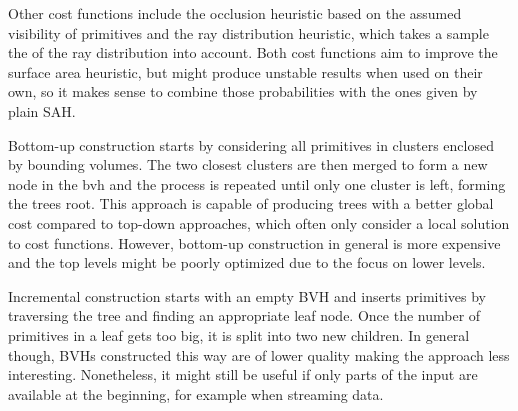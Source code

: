 Other cost functions include the occlusion heuristic\cite{vinkler12visibility} based on the assumed visibility of primitives and the ray distribution heuristic\cite{bittner09rdh}, which takes a sample the of the ray distribution into account. Both cost functions aim to improve the surface area heuristic, but might produce unstable results when used on their own, so it makes sense to combine those probabilities with the ones given by plain SAH.

Bottom-up construction\cite{Walter2008FastAC} starts by considering all primitives in clusters enclosed by bounding volumes. The two closest clusters are then merged to form a new node in the \acrshort{bvh} and the process is repeated until only one cluster is left, forming the trees root.
This approach is capable of producing trees with a better global cost compared to top-down approaches, which often only consider a local solution to cost functions. However, bottom-up construction in general is more expensive and the top levels might be poorly optimized due to the focus on lower levels.

Incremental construction\cite{goldsmith_automatic_1987} starts with an empty BVH and inserts primitives by traversing the tree and finding an appropriate leaf node. Once the number of primitives in a leaf gets too big, it is split into two new children. In general though, BVHs constructed this way are of lower quality making the approach less interesting. Nonetheless, it might still be useful if only parts of the input are available at the beginning, for example when streaming data.
\cleardoublepage